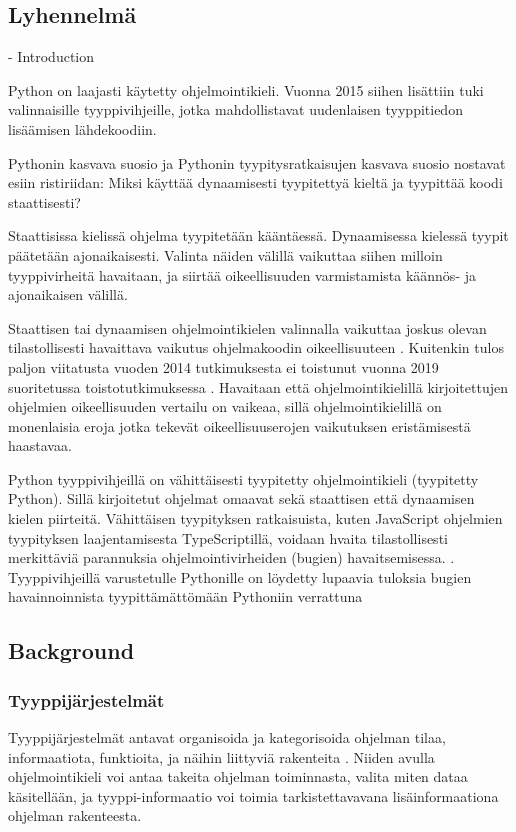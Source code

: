 \begin{otherlanguage}{finnish}
\chapter*{Lyhennelmä}

- Introduction

Python on laajasti käytetty ohjelmointikieli. Vuonna 2015 siihen lisättiin tuki valinnaisille tyyppivihjeille, jotka mahdollistavat uudenlaisen tyyppitiedon lisäämisen lähdekoodiin.

Pythonin kasvava suosio ja Pythonin tyypitysratkaisujen kasvava suosio nostavat esiin ristiriidan: Miksi käyttää dynaamisesti tyypitettyä kieltä ja tyypittää koodi staattisesti?

Staattisissa kielissä ohjelma tyypitetään kääntäessä. Dynaamisessa kielessä tyypit päätetään ajonaikaisesti. Valinta näiden välillä vaikuttaa siihen milloin tyyppivirheitä havaitaan, ja siirtää oikeellisuuden varmistamista käännös- ja ajonaikaisen välillä.

Staattisen tai dynaamisen ohjelmointikielen valinnalla vaikuttaa joskus olevan tilastollisesti havaittava vaikutus ohjelmakoodin oikeellisuuteen \cite{nanz_comparative_2015, ray_codequality_2014}. Kuitenkin tulos paljon viitatusta vuoden 2014 tutkimuksesta \cite{ray_codequality_2014} ei toistunut vuonna 2019 suoritetussa toistotutkimuksessa \cite{codequality_reproudction_2019}. Havaitaan että ohjelmointikielillä kirjoitettujen ohjelmien oikeellisuuden vertailu on vaikeaa, sillä ohjelmointikielillä on monenlaisia eroja jotka tekevät oikeellisuuserojen vaikutuksen eristämisestä haastavaa.

Python tyyppivihjeillä on vähittäisesti tyypitetty ohjelmointikieli (tyypitetty Python). Sillä kirjoitetut ohjelmat omaavat sekä staattisen että dynaamisen kielen piirteitä. Vähittäisen tyypityksen ratkaisuista, kuten JavaScript ohjelmien tyypityksen laajentamisesta TypeScriptillä, voidaan hvaita tilastollisesti merkittäviä parannuksia ohjelmointivirheiden (bugien) havaitsemisessa. \cite{gao_to_type_or_not_2017}. Tyyppivihjeillä varustetulle Pythonille on löydetty lupaavia tuloksia bugien havainnoinnista tyypittämättömään Pythoniin verrattuna \cite{khan_empirical_2022, rak-amnouykit_taleoftwo_2020}

\section*{Background}
\subsection*{Tyyppijärjestelmät}
Tyyppijärjestelmät antavat organisoida ja kategorisoida ohjelman tilaa, informaatiota, funktioita, ja näihin liittyviä rakenteita \cite{programming_langs}. Niiden avulla ohjelmointikieli voi antaa takeita ohjelman toiminnasta, valita miten dataa käsitellään, ja tyyppi-informaatio voi toimia tarkistettavavana lisäinformaationa ohjelman rakenteesta.


\end{otherlanguage}
